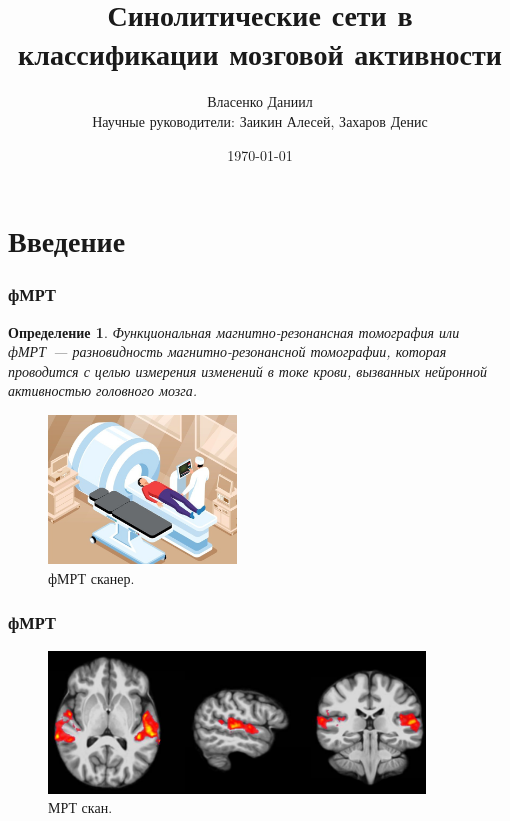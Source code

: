 \documentclass{beamer}
\newtheorem{definition_}{Определение}
\begin{document}
	\title{Синолитические сети в классификации мозговой активности}  
	\author{Власенко Даниил\\
	{\footnotesize Научные руководители: Заикин Алесей, Захаров Денис}
	}
	\date{\today} 
	
	\begin{frame}
		\titlepage
	\end{frame}

	\section{Введение} 
	\begin{frame}
		\frametitle{фМРТ} 
							
		\begin{definition_}
			Функциональная магнитно-резонансная томография или фМРТ~--- разновидность магнитно-резонансной томографии, которая проводится с целью измерения изменений в токе крови, вызванных нейронной активностью головного мозга. 
		\end{definition_}
	
		\begin{figure}
			\includegraphics[width=5cm]{../images/fmri_1.jpeg}
			\caption{фМРТ сканер.} 
			\label{fg:1}
		\end{figure}		
	\end{frame}

	\begin{frame} 
		\frametitle{фМРТ}
		\begin{figure}
			\includegraphics[width=10cm]{../images/fmri_2.png}
			\caption{МРТ скан.} 
			\label{fg:2}
		\end{figure}
	\end{frame}
\end{document}

